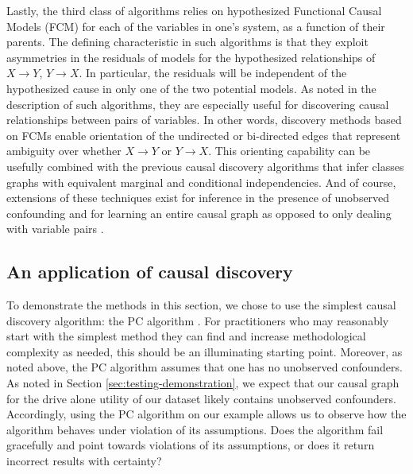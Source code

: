 Lastly, the third class of algorithms relies on hypothesized Functional Causal Models (FCM) \citep{goudet_2018_learning} for each of the variables in one's system, as a function of their parents.
The defining characteristic in such algorithms is that they exploit asymmetries in the residuals of models for the hypothesized relationships of $X \rightarrow Y$, $Y \rightarrow X$.
In particular, the residuals will be independent of the hypothesized cause in only one of the two potential models.
As noted in the description of such algorithms, they are especially useful for discovering causal relationships between pairs of variables.
In other words, discovery methods based on FCMs enable orientation of the undirected or bi-directed edges that represent ambiguity over whether $X \rightarrow Y$ or $Y \rightarrow X$.
This orienting capability can be usefully combined with the previous causal discovery algorithms that infer classes graphs with equivalent marginal and conditional independencies.
And of course, extensions of these techniques exist for inference in the presence of unobserved confounding \citep[Sec. 6]{goudet_2018_learning} and for learning an entire causal graph as opposed to only dealing with variable pairs \citep{zheng_2020_learning}.

\subsection{An application of causal discovery}
\label{sec:discovery-application}
To demonstrate the methods in this section, we chose to use the simplest causal discovery algorithm: the PC algorithm \citep{glymour_2001_causation}.
For practitioners who may reasonably start with the simplest method they can find and increase methodological complexity as needed, this should be an illuminating starting point.
Moreover, as noted above, the PC algorithm assumes that one has no unobserved confounders.
As noted in Section \ref{sec:testing-demonstration}, we expect that our causal graph for the drive alone utility of our dataset likely contains unobserved confounders.
Accordingly, using the PC algorithm on our example allows us to observe how the algorithm behaves under violation of its assumptions.
Does the algorithm fail gracefully and point towards violations of its assumptions, or does it return incorrect results with certainty?

